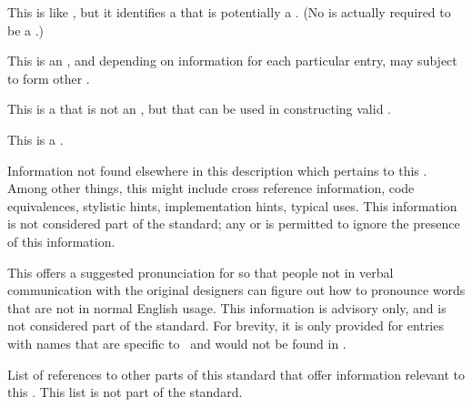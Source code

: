 This is like , but it identifies a  that is potentially
a .  (No  is actually required to be a
.)


This is an ,
and depending on information for each particular entry,
may subject to form other .


This is a  that is not an ,
but that can be used in constructing valid .


This is a .

\endlist

\endsubsubsection%


Information not found elsewhere in this description
which pertains to this .
Among other things, this might include 
 cross reference information,
 code equivalences, 
 stylistic hints,
 implementation hints,
 typical uses.
This information is not considered part of the standard;
any  or 
is permitted to ignore the presence of this information.

\endsubsubsection%


This offers a suggested pronunciation for  
so that people not in verbal communication with the original designers
can figure out how to pronounce words that are not in normal English usage.
This information is advisory only, and is not considered part of the standard.
For brevity, it is only provided for entries with names that are specific to
\clisp\ and would not be found in {\WebstersDictionary}.

\endsubsubsection%


List of references to other parts of this standard
that offer information relevant to this . 
This list is not part of the standard.
         
